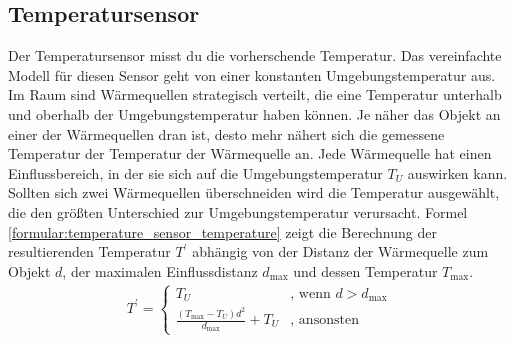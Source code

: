 \subsection{Temperatursensor}
Der Temperatursensor misst du die vorherschende Temperatur.
Das vereinfachte Modell für diesen Sensor geht von einer konstanten Umgebungstemperatur aus.
Im Raum sind Wärmequellen strategisch verteilt, die eine Temperatur unterhalb und oberhalb der Umgebungstemperatur haben können.
Je näher das Objekt an einer der Wärmequellen dran ist, desto mehr nähert sich die gemessene Temperatur der Temperatur der Wärmequelle an.
\newline
\newline
Jede Wärmequelle hat einen Einflussbereich, in der sie sich auf die Umgebungstemperatur $T_U$ auswirken kann.
Sollten sich zwei Wärmequellen überschneiden wird die Temperatur ausgewählt, die den größten Unterschied zur Umgebungstemperatur verursacht.
Formel \ref{formular:temperature_sensor_temperature} zeigt die Berechnung der resultierenden Temperatur $T^{\prime}$ abhängig von der Distanz der
Wärmequelle zum Objekt $d$, der maximalen Einflussdistanz $d_{\max}$ und dessen Temperatur $T_{\max}$.
\begin{align}
    \label{formular:temperature_sensor_temperature}
    T^{\prime} = \begin{cases}
                     T_U & \text{, wenn } d > d_{\max} \\
                     \frac{(T_{\max} - T_U)d^2}{d_{\max}} + T_U & \text{, ansonsten}
    \end{cases}
\end{align}

